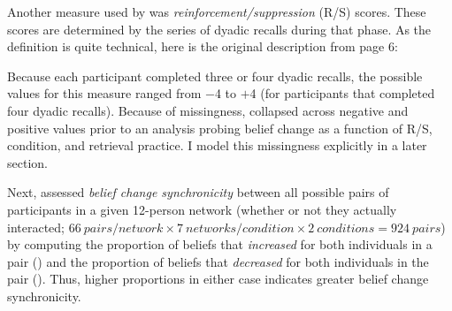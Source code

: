 \documentclass[12pt]{article}  %
\begin{document}
Another measure used by \textcite{vlasceanu_synchronization_2020} was \textit{reinforcement/suppression} (R/S) scores. These scores are determined by the series of dyadic recalls during that phase. As the definition is quite technical, here is the original description from page 6:

\singlespacing
\begin{center}
\end{center}
\doublespacing

\noindent Because each participant completed three or four dyadic recalls, the possible values for this measure ranged from $-$4 to $+$4 (for participants that completed four dyadic recalls). Because of missingness, \textcite{vlasceanu_synchronization_2020} collapsed across negative and positive values prior to an analysis probing belief change as a function of R/S, condition, and retrieval practice. I model this missingness explicitly in a later section.

Next, \textcite{vlasceanu_synchronization_2020} assessed \textit{belief change synchronicity} between all possible pairs of participants in a given 12-person network (whether or not they actually interacted; $66\:pairs/network \times 7\:networks/condition \times 2\:conditions = 924\:pairs$) by computing the proportion of beliefs that \textit{increased} for both individuals in a pair () and the proportion of beliefs that \textit{decreased} for both individuals in the pair (). Thus, higher proportions in either case indicates greater belief change synchronicity. 
\end{document}
